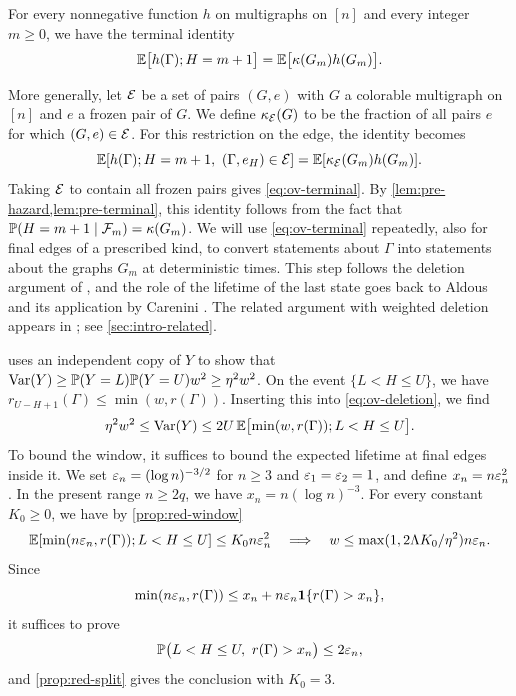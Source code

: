 For every nonnegative function $h$ on multigraphs on $[n]$ and every integer $m \ge 0$, we have the terminal identity
\begin{equation}\label{eq:ov-terminal}
\mathbb E\bigl[h(\Gamma); H = m + 1\bigr] = \mathbb E\bigl[\kappa(G_m) h(G_m)\bigr].
\end{equation}

More generally, let $\mathcal E$ be a set of pairs $(G, e)$ with $G$ a colorable multigraph on $[n]$ and $e$ a frozen pair of $G$. We define $\kappa_\mathcal E(G)$ to be the fraction of all pairs $e$ for which $(G, e) \in \mathcal E$. For this restriction on the edge, the identity becomes
\[
\mathbb E[h(\Gamma);H = m + 1, \ (\Gamma, e_H) \in \mathcal E]
= \mathbb E[\kappa_\mathcal E(G_m)h(G_m)].
\]
Taking $\mathcal E$ to contain all frozen pairs gives \eqref{eq:ov-terminal}. By \cref{lem:pre-hazard,lem:pre-terminal}, this identity follows from the fact that $\mathbb P(H = m + 1 \mid \mathcal F_m) = \kappa(G_m)$. We will use \eqref{eq:ov-terminal} repeatedly, also for final edges of a prescribed kind, to convert statements about $\Gamma$ into statements about the graphs $G_m$ at deterministic times. This step follows the deletion argument of \cite[Lemmas~3.1 and~3.2]{openai2026limiting}, and the role of the lifetime of the last state goes back to Aldous \cite[Theorem~1(b)]{aldous1991threshold} and its application by Carenini \cite[Theorem~4.1]{carenini2026polynomial}. The related argument with weighted deletion appears in \cite[Section~3.3, Lemma~3.4]{openai2026variance}; see \cref{sec:intro-related}.

 uses an independent copy of $Y$ to show that $\operatorname{Var}(Y) \ge \mathbb P(Y = L) \mathbb P(Y = U) w^2 \ge \eta^2 w^2$. On the event $\{L < H \le U\}$, we have $r_{U - H + 1}(\Gamma) \le \min(w, r(\Gamma))$. Inserting this into \eqref{eq:ov-deletion}, we find
\begin{equation}\label{eq:ov-window-lifetime}
\eta^2 w^2 \le \operatorname{Var}(Y) \le 2U \, \mathbb E\bigl[\min(w, r(\Gamma)); L < H \le U\bigr].
\end{equation}
To bound the window, it suffices to bound the expected lifetime at final edges inside it. We set $\varepsilon_n = (\log n)^{-3/2}$ for $n \ge 3$ and $\varepsilon_1 = \varepsilon_2 = 1$, and define $x_n = n\varepsilon_n^2$. In the present range $n \ge 2q$, we have $x_n = n(\log n)^{-3}$. For every constant $K_0 \ge 0$, we have by \cref{prop:red-window}
\[
\mathbb E[\min(n\varepsilon_n, r(\Gamma));L < H \le U] \le K_0n\varepsilon_n^2
\quad\Longrightarrow\quad
w \le \max(1, 2\Lambda K_0/\eta^2)n\varepsilon_n.
\]
Since
\[
\min(n\varepsilon_n, r(\Gamma)) \le x_n + n\varepsilon_n\mathbf 1\{r(\Gamma) > x_n\},
\]
it suffices to prove
\begin{equation}\label{eq:ov-target}
\mathbb P\bigl(L < H \le U, \ r(\Gamma) > x_n\bigr) \le 2 \varepsilon_n,
\end{equation}
and \cref{prop:red-split} gives the conclusion with $K_0 = 3$.

